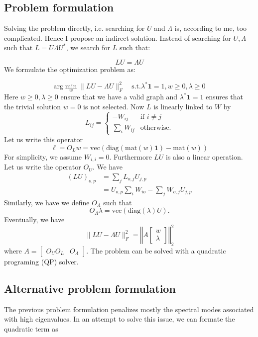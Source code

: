 \subsection{Problem formulation}

Solving the problem directly, i.e. searching for $U$ and $\Lambda$
is, according to me, too complicated. Hence I propose an indirect
solution. Instead of searching for $U,\Lambda$ such that $L=U\Lambda U^{*}$,
we search for $L$ such that:

\[
LU=\Lambda U
\]
We formulate the optimization problem as:

\[
\text{arg}\min_{w}\|LU-\Lambda U\|_{F}^{2}\hspace{1em}\text{s.t.}\lambda^{*}\mathbf{1}=1,w\geq0,\lambda\ge0
\]
Here $w\geq0,\lambda\geq0$ ensure that we have a valid graph and
$\lambda^{*}\mathbf{1}=1$ ensures that the trivial solution $w=0$
is not selected. Now $L$ is linearly linked to $W$ by
\[
L_{ij}=\begin{cases}
-W_{ij} & \text{if }i\ne j\\
\sum_{i}W_{ij} & \text{otherwise.}
\end{cases}
\]
Let us write this operator 
\[
\ell=O_{L}w=\text{vec}\left(\text{diag}(\text{mat}(w)\mathbf{1})-\text{mat}(w)\right)
\]
For simplicity, we assume $W_{i,i}=0$. Furthermore $LU$ is also
a linear operation. Let us write the operator $O_{U}.$ We have 
\begin{align*}
\left(LU\right)_{o,p} & =\sum_{j}L_{o,j}U_{j,p}\\
& =U_{o,p}\sum_{i}W_{io}-\sum_{j}W_{o,j}U_{j,p}
\end{align*}
Similarly, we have we define $O_{\Lambda}$ such that 
\[
O_{\Lambda}\lambda=\text{vec}(\text{diag}(\lambda)U).
\]
Eventually, we have 
\[
\|LU-\Lambda U\|_{F}^{2}=\left\Vert A\left[\begin{array}{c}
w\\
\lambda
\end{array}\right]\right\Vert _{2}^{2}
\]
where $A=\left[\begin{array}{cc}
O_{U}O_{L} & O_{\Lambda}\end{array}\right]$. The problem can be solved with a quadratic programing (QP) solver.

\subsection{Alternative problem formulation}

The previous problem formulation penalizes mostly the spectral modes associated with high eigenvalues. In an attempt to solve this issue, we can formate the quadratic term as

